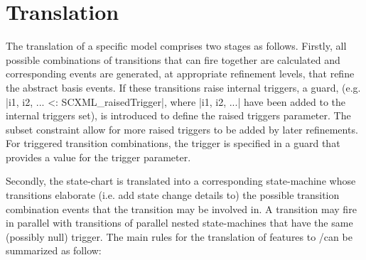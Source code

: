 
\section{\SCXML Translation}
\label{sec:translation}

The translation of a specific \SCXML model comprises two stages as follows. 
Firstly, all possible combinations of transitions that can fire together are calculated and corresponding events are generated, at appropriate refinement levels, that refine the abstract basis events.  
If these transitions raise internal triggers, a guard, (e.g. |{i1, i2, ...} <: SCXML_raisedTrigger|, where |i1, i2, ...| have been added to the internal triggers set), is introduced to define the raised triggers parameter. 
The subset constraint allow for more raised triggers to be added by later refinements.
For triggered transition combinations, the trigger is specified in a guard that provides a value for the trigger parameter. 


Secondly, the \SCXML state-chart is translated into a corresponding \UMLB state-machine whose transitions elaborate (i.e. add state change details to) the possible transition combination events that the transition may be involved in. 
A transition may fire in parallel with transitions of parallel nested state-machines that have the same (possibly null) trigger.
The main rules for the translation of \SCXML features to \UMLB/\EVENTB can be summarized as follow:

